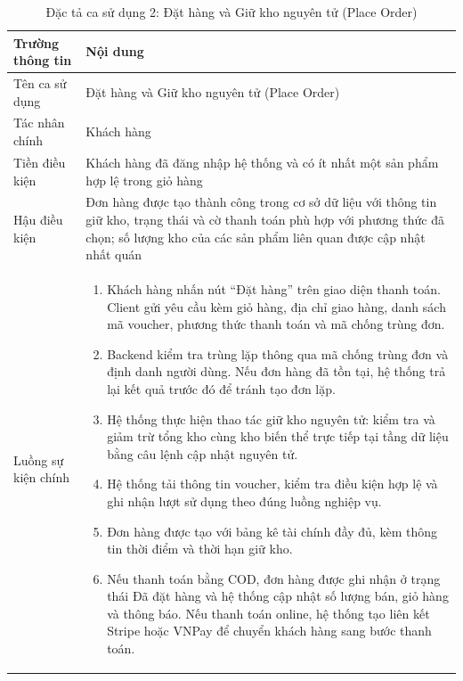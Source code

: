\documentclass[../DoAn.tex]{subfiles}
\begin{document}
\begin{table}[H]
\centering
\caption{Đặc tả ca sử dụng 2: Đặt hàng và Giữ kho nguyên tử (Place Order)}
\label{table:uc2_placeorder}
\renewcommand{\arraystretch}{1.4}
\begin{tabular}{|>{\columncolor{blue!6}\raggedright\arraybackslash}p{3.5cm}|>{\raggedright\arraybackslash}p{10.5cm}|}
\hline
\rowcolor{blue!18}
\textbf{Trường thông tin} & \textbf{Nội dung} \\
\hline
Tên ca sử dụng & Đặt hàng và Giữ kho nguyên tử (Place Order) \\
\hline
Tác nhân chính & Khách hàng \\
\hline
Tiền điều kiện & Khách hàng đã đăng nhập hệ thống và có ít nhất một sản phẩm hợp lệ trong giỏ hàng \\
\hline
Hậu điều kiện & Đơn hàng được tạo thành công trong cơ sở dữ liệu với thông tin giữ kho, trạng thái và cờ thanh toán phù hợp với phương thức đã chọn; số lượng kho của các sản phẩm liên quan được cập nhật nhất quán \\
\hline
Luồng sự kiện chính &
\begin{minipage}[t]{10.3cm}
\vspace{3pt}
\begin{enumerate}[leftmargin=1.5em, topsep=0pt, parsep=0pt, itemsep=2pt, partopsep=0pt]
    \item Khách hàng nhấn nút ``Đặt hàng'' trên giao diện thanh toán. Client gửi yêu cầu kèm giỏ hàng, địa chỉ giao hàng, danh sách mã voucher, phương thức thanh toán và mã chống trùng đơn.
    \item Backend kiểm tra trùng lặp thông qua mã chống trùng đơn và định danh người dùng. Nếu đơn hàng đã tồn tại, hệ thống trả lại kết quả trước đó để tránh tạo đơn lặp.
    \item Hệ thống thực hiện thao tác giữ kho nguyên tử: kiểm tra và giảm trừ tổng kho cùng kho biến thể trực tiếp tại tầng dữ liệu bằng câu lệnh cập nhật nguyên tử.
    \item Hệ thống tải thông tin voucher, kiểm tra điều kiện hợp lệ và ghi nhận lượt sử dụng theo đúng luồng nghiệp vụ.
    \item Đơn hàng được tạo với bảng kê tài chính đầy đủ, kèm thông tin thời điểm và thời hạn giữ kho.
    \item Nếu thanh toán bằng COD, đơn hàng được ghi nhận ở trạng thái Đã đặt hàng và hệ thống cập nhật số lượng bán, giỏ hàng và thông báo. Nếu thanh toán online, hệ thống tạo liên kết Stripe hoặc VNPay để chuyển khách hàng sang bước thanh toán.

\end{enumerate}
\end{minipage}
\end{tabular}
\end{table}
\end{document}
